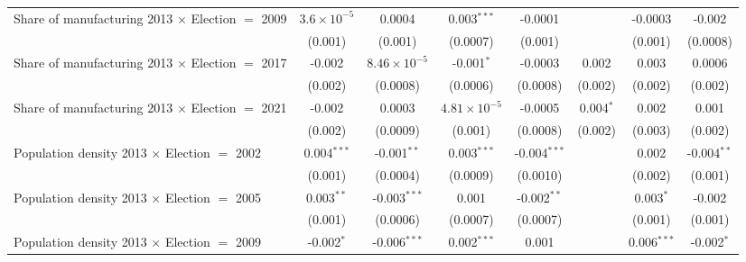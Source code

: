 \begin{table}[htbp]
\begin{tabular}{lccccccc}
      Share of manufacturing 2013 $\times$ Election $=$ 2009  & $3.6\times 10^{-5}$  & 0.0004                & 0.003$^{***}$         & -0.0001        &                & -0.0003        & -0.002\\   
                                                              & (0.001)              & (0.001)               & (0.0007)              & (0.001)        &                & (0.001)        & (0.0008)\\   
      Share of manufacturing 2013 $\times$ Election $=$ 2017  & -0.002               & $8.46\times 10^{-5}$  & -0.001$^{*}$          & -0.0003        & 0.002          & 0.003          & 0.0006\\   
                                                              & (0.002)              & (0.0008)              & (0.0006)              & (0.0008)       & (0.002)        & (0.002)        & (0.002)\\   
      Share of manufacturing 2013 $\times$ Election $=$ 2021  & -0.002               & 0.0003                & $4.81\times 10^{-5}$  & -0.0005        & 0.004$^{*}$    & 0.002          & 0.001\\   
                                                              & (0.002)              & (0.0009)              & (0.001)               & (0.0008)       & (0.002)        & (0.003)        & (0.002)\\   
      Population density 2013 $\times$ Election $=$ 2002      & 0.004$^{***}$        & -0.001$^{**}$         & 0.003$^{***}$         & -0.004$^{***}$ &                & 0.002          & -0.004$^{**}$\\   
                                                              & (0.001)              & (0.0004)              & (0.0009)              & (0.0010)       &                & (0.002)        & (0.001)\\   
      Population density 2013 $\times$ Election $=$ 2005      & 0.003$^{**}$         & -0.003$^{***}$        & 0.001                 & -0.002$^{**}$  &                & 0.003$^{*}$    & -0.002\\   
                                                              & (0.001)              & (0.0006)              & (0.0007)              & (0.0007)       &                & (0.001)        & (0.001)\\   
      Population density 2013 $\times$ Election $=$ 2009      & -0.002$^{*}$         & -0.006$^{***}$        & 0.002$^{***}$         & 0.001          &                & 0.006$^{***}$  & -0.002$^{*}$\\   

\end{tabular}
\end{table}
